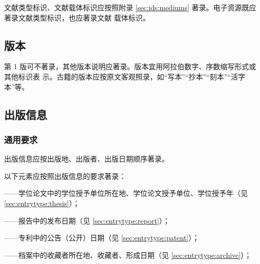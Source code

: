 \documentclass[twoside]{article}%
\begin{document}
文献类型标识、文献载体标识应按照附录 \ref{sec:ids:mediums} 著录。电子资源既应著录文献类型标识，也应著录文献
载体标识。

\begin{refsection}
\nocite{马寅初讲义--}
\nocite{环境司法--}
\nocite{严复思想--}
\nocite{中子反射--}
\nocite{信息与文献--}
\nocite{智能戒指--}
\nocite{Quantumfield--}

{}
\end{refsection}

\subsection{版本}

第 1 版可不著录，其他版本说明应著录。版本宜用阿拉伯数字、序数缩写形式或其他标识表
示。古籍的版本应按原文客观照录，如“写本”“抄本”“刻本”“活字本”等。

\begin{refsection}
\nocite{egbookeda--}
\nocite{egbookedb--}
\nocite{egbookedc--,egbookedf--}
\nocite{egbookedd--}
\nocite{egbookede--}
{}
\end{refsection}

\subsection{出版信息}\label{sec:pub:full}

\subsubsection{通用要求}\label{sec:pub:gene}\leavevmode\par

出版信息应按出版地、出版者、出版日期顺序著录。

以下元素应按照出版信息的要求著录：


——学位论文中的学位授予单位所在地、学位论文授予单位、学位授予年（见 \ref{sec:entrytype:thesis}）；

——报告中的发布日期（见 \ref{sec:entrytype:report}）；

——专利中的公告（公开）日期（见 \ref{sec:entrytype:patent}）；

——档案中的收藏者所在地、收藏者、形成日期（见 \ref{sec:entrytype:archive}）；
\end{document}
